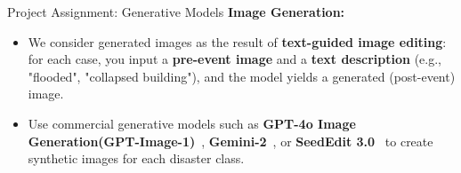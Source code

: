   \begin{refsection}
    \begin{frame}{Project Assignment: Generative Models}
      \textbf{Image Generation:}
      \begin{itemize}
        \item We consider generated images as the result of \textbf{text-guided image editing}: for each case, you input a \textbf{pre-event image} and a \textbf{text description} (e.g., "flooded", "collapsed building"), and the model yields a generated (post-event) image.
        \item Use commercial generative models such as \textbf{GPT-4o Image Generation(GPT-Image-1)}~\parencite{gptimage1}, \textbf{Gemini-2}~\parencite{gemini2}, or \textbf{SeedEdit 3.0}~\parencite{wang2025seedit} to create synthetic images for each disaster class.
      \end{itemize}
      \bottomleftrefs
    \end{frame}
  \end{refsection}
  

